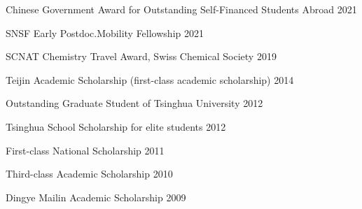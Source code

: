 

\begin{cvhonors}
  \cvhonor
  {Chinese Government Award for Outstanding Self-Financed Students Abroad}
  {2021}

  \cvhonor
  {SNSF Early Postdoc.Mobility Fellowship}
  {2021}

  \cvhonor
  {SCNAT Chemistry Travel Award, Swiss Chemical Society}
  {2019}
  
  \cvhonor
  {Teijin Academic Scholarship (first-class academic scholarship)}
  {2014}
  
  \cvhonor
  {Outstanding Graduate Student of Tsinghua University}
  {2012}
  
  \cvhonor
  {Tsinghua School Scholarship for elite students}
  {2012}
  
  \cvhonor
  {First-class National Scholarship}
  {2011}
  
  \cvhonor
  {Third-class Academic Scholarship}
  {2010}
  
  \cvhonor
  {Dingye Mailin Academic Scholarship}
  {2009}
\end{cvhonors}
